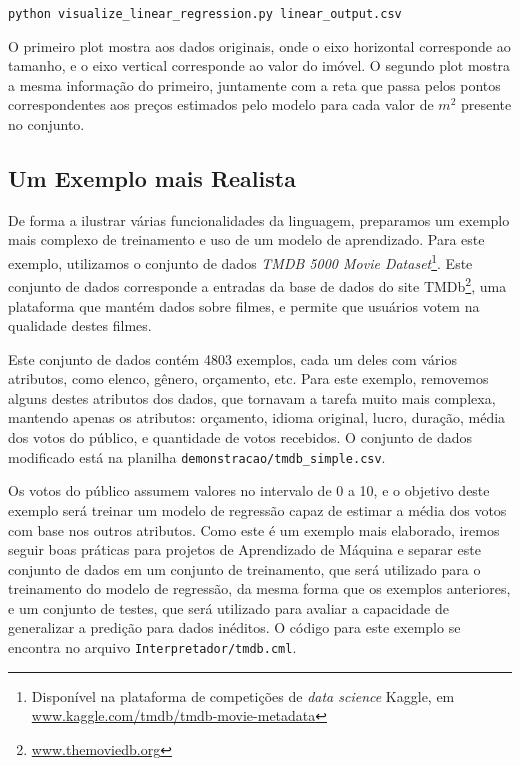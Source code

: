\documentclass[12pt]{article}
\begin{document}
\begin{verbatim}
python visualize_linear_regression.py linear_output.csv
\end{verbatim}

O primeiro plot mostra aos dados originais, onde o eixo horizontal corresponde ao tamanho, e o eixo vertical corresponde ao valor do imóvel. O segundo plot mostra a mesma informação do primeiro, juntamente com a reta que passa pelos pontos correspondentes aos preços estimados pelo modelo para cada valor de $m^2$ presente no conjunto.

\subsection{Um Exemplo mais Realista}

De forma a ilustrar várias funcionalidades da linguagem, preparamos um exemplo mais complexo de treinamento e uso de um modelo de aprendizado. Para este exemplo, utilizamos o conjunto de dados \textit{TMDB 5000 Movie Dataset}\footnote{Disponível na plataforma de competições de \textit{data science} Kaggle, em \url{www.kaggle.com/tmdb/tmdb-movie-metadata}}. Este conjunto de dados corresponde a entradas da base de dados do site TMDb\footnote{\url{www.themoviedb.org}}, uma plataforma que mantém dados sobre filmes, e permite que usuários votem na qualidade destes filmes. 

Este conjunto de dados contém 4803 exemplos, cada um deles com vários atributos, como elenco, gênero, orçamento, etc. Para este exemplo, removemos alguns destes atributos dos dados, que tornavam a tarefa muito mais complexa, mantendo apenas os atributos: orçamento, idioma original, lucro, duração, média dos votos do público, e quantidade de votos recebidos. O conjunto de dados modificado está na planilha \texttt{demonstracao/tmdb\_simple.csv}. 

Os votos do público assumem valores no intervalo de 0 a 10, e o objetivo deste exemplo será treinar um modelo de regressão capaz de estimar a média dos votos com base nos outros atributos. Como este é um exemplo mais elaborado, iremos seguir boas práticas para projetos de Aprendizado de Máquina e separar este conjunto de dados em um conjunto de treinamento, que será utilizado para o treinamento do modelo de regressão, da mesma forma que os exemplos anteriores, e um conjunto de testes, que será utilizado para avaliar a capacidade de generalizar a predição para dados inéditos. O código para este exemplo se encontra no arquivo \texttt{Interpretador/tmdb.cml}.
\end{document}
